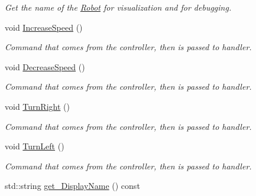 \begin{DoxyCompactItemize}
\begin{DoxyCompactList}\small\item\em Get the name of the \hyperlink{classRobot}{Robot} for visualization and for debugging. \end{DoxyCompactList}\item 
void \hyperlink{classRobot_ae4647cccd002ca13659017e634237ead}{Increase\+Speed} ()\hypertarget{classRobot_ae4647cccd002ca13659017e634237ead}{}\label{classRobot_ae4647cccd002ca13659017e634237ead}

\begin{DoxyCompactList}\small\item\em Command that comes from the controller, then is passed to handler. \end{DoxyCompactList}\item 
void \hyperlink{classRobot_a94afa6f63eb22667261c07933faae481}{Decrease\+Speed} ()\hypertarget{classRobot_a94afa6f63eb22667261c07933faae481}{}\label{classRobot_a94afa6f63eb22667261c07933faae481}

\begin{DoxyCompactList}\small\item\em Command that comes from the controller, then is passed to handler. \end{DoxyCompactList}\item 
void \hyperlink{classRobot_a12b5883779f682c66e71bc54b6539694}{Turn\+Right} ()\hypertarget{classRobot_a12b5883779f682c66e71bc54b6539694}{}\label{classRobot_a12b5883779f682c66e71bc54b6539694}

\begin{DoxyCompactList}\small\item\em Command that comes from the controller, then is passed to handler. \end{DoxyCompactList}\item 
void \hyperlink{classRobot_ad864d21d997dbadf55f997c2f0143d41}{Turn\+Left} ()\hypertarget{classRobot_ad864d21d997dbadf55f997c2f0143d41}{}\label{classRobot_ad864d21d997dbadf55f997c2f0143d41}

\begin{DoxyCompactList}\small\item\em Command that comes from the controller, then is passed to handler. \end{DoxyCompactList}\item 
std\+::string \hyperlink{classRobot_aa180bfc01790ced7b501903a1a2aca0c}{get\+\_\+\+Display\+Name} () const \hypertarget{classRobot_aa180bfc01790ced7b501903a1a2aca0c}{}\label{classRobot_aa180bfc01790ced7b501903a1a2aca0c}


\end{DoxyCompactItemize}
